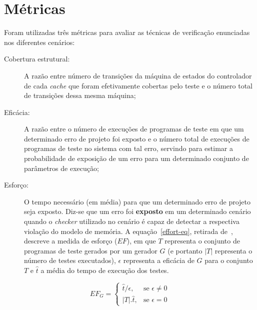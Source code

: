 \section{Métricas}

Foram utilizadas três métricas para avaliar as técnicas de verificação
enunciadas nos diferentes cenários:

\begin{description}
    \item[Cobertura estrutural:] A razão entre número de transições da máquina
        de estados do controlador de cada \textit{cache} que foram efetivamente
        cobertas pelo teste e o número total de transições dessa mesma máquina;

    \item[Eficácia:] A razão entre o número de execuções de programas de teste
        em que um determinado erro de projeto foi exposto e o número total de
        execuções de programas de teste no sistema com tal erro, servindo para
        estimar a probabilidade de exposição de um erro para um determinado
        conjunto de parâmetros de execução;

    \item[Esforço:] O tempo necessário (em média) para que um determinado erro
        de projeto seja exposto. Diz-se que um erro foi \textbf{exposto} em um
        determinado cenário quando o \textit{checker} utilizado no cenário é
        capaz de detectar a respectiva violação do modelo de memória. A
        equação~\ref{effort-eq}, retirada de~\cite{Andrade:2017}, descreve a
        medida de esforço ($EF$), em que $T$ representa o conjunto de programas
        de teste gerados por um gerador $G$ (e portanto $|T|$ representa o
        número de testes executados), $\epsilon$ representa a eficácia de $G$
        para o conjunto $T$ e $\hat{t}$ a média do tempo de execução dos
        testes.
\end{description}

\begin{equation}
    \label{effort-eq}
    EF_G = \begin{cases}
               \hat{t}/\epsilon, & \mbox{se } \epsilon \neq 0\\
               |T|.\hat{t},      & \mbox{se } \epsilon = 0
           \end{cases}
\end{equation}
